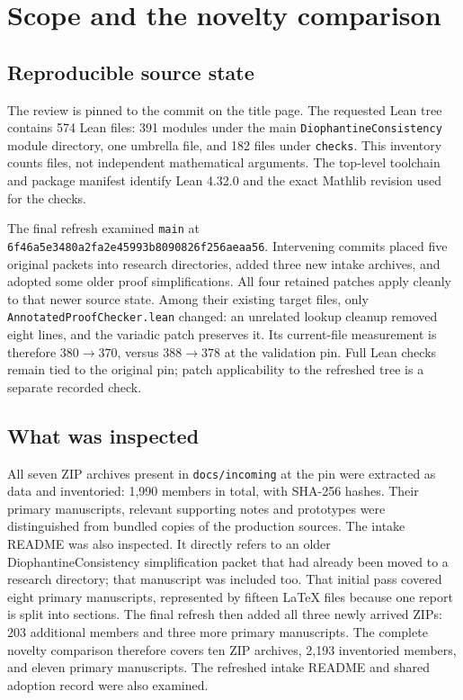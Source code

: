 \documentclass[11pt]{article}
\theoremstyle{remark}\newtheorem{remark}[proposition]{Remark}
\newcommand{\code}[1]{\nolinkurl{#1}}
\begin{document}
\section{Scope and the novelty comparison}

\subsection{Reproducible source state}

The review is pinned to the commit on the title page. The requested Lean tree contains 574 Lean files: 391 modules under the main \code{DiophantineConsistency} module directory, one umbrella file, and 182 files under \code{checks}. This inventory counts files, not independent mathematical arguments. The top-level toolchain and package manifest identify Lean 4.32.0 and the exact Mathlib revision used for the checks.

The final refresh examined \code{main} at \code{6f46a5e3480a2fa2e45993b8090826f256aeaa56}. Intervening commits placed five original packets into research directories, added three new intake archives, and adopted some older proof simplifications. All four retained patches apply cleanly to that newer source state. Among their existing target files, only \code{AnnotatedProofChecker.lean} changed: an unrelated lookup cleanup removed eight lines, and the variadic patch preserves it. Its current-file measurement is therefore \(380\to370\), versus \(388\to378\) at the validation pin. Full Lean checks remain tied to the original pin; patch applicability to the refreshed tree is a separate recorded check.

\subsection{What was inspected}

All seven ZIP archives present in \code{docs/incoming} at the pin were extracted as data and inventoried: 1,990 members in total, with SHA-256 hashes. Their primary manuscripts, relevant supporting notes and prototypes were distinguished from bundled copies of the production sources. The intake README was also inspected. It directly refers to an older DiophantineConsistency simplification packet that had already been moved to a research directory; that manuscript was included too. That initial pass covered eight primary manuscripts, represented by fifteen LaTeX files because one report is split into sections. The final refresh then added all three newly arrived ZIPs: 203 additional members and three more primary manuscripts. The complete novelty comparison therefore covers ten ZIP archives, 2,193 inventoried members, and eleven primary manuscripts. The refreshed intake README and shared adoption record were also examined.
\end{document}

